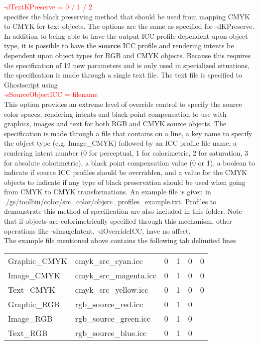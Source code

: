 \documentclass[12pt,notitlepage]{article}
\begin{document}
\textcolor{red}{-dTextKPreserve = 0 / 1 / 2}\\

\noindent specifies the black preserving method that should be used from mapping CMYK to CMYK for text objects.   The
options are the same as specified for -dKPreserve.\\

In addition to being able to have the output ICC profile dependent upon object type, it is possible to have the {\bf source} ICC profile and rendering intents be dependent upon object types for RGB and CMYK objects.  Because this requires the specification of 12 new parameters and is only used in specialized situations, the specification is made through a single text file.  The text file is specified to Ghostscript using\\

\textcolor{red}{-sSourceObjectICC = filename}\\

This option provides an extreme level of override control to specify the source color spaces, rendering intents and black point compensation to use with graphics, images and text for both RGB and CMYK source objects. The specification is made through a file that contains on a line, a key name to specify the object type (e.g. Image\_CMYK) followed by an ICC profile file name, a rendering intent number (0 for perceptual, 1 for colorimetric, 2 for saturation, 3 for absolute colorimetric), a black point compensation value (0 or 1), a boolean to indicate if source ICC profiles should be overridden, and a value for the CMYK objects to indicate if any type of black preservation should be used when going from CMYK to CMYK transformations. An example file is given in ./gs/toolbin/color/src\_color/objsrc\_profiles\_example.txt. Profiles to demonstrate this method of specification are also included in this folder. Note that if objects are colorimetrically specified through this mechanism, other operations like -sImageIntent, -dOverrideICC, have no affect.\\

The example file mentioned above contains the following tab delimited lines\\

\begin{tabular}{llllll}
Graphic\_CMYK & cmyk\_src\_cyan.icc	& 0 & 1 & 0 & 0 \\
Image\_CMYK	& cmyk\_src\_magenta.icc &	0 & 1 & 0 & 0  \\
Text\_CMYK	& cmyk\_src\_yellow.icc	 & 0 & 1 & 0 & 0  \\
Graphic\_RGB &	rgb\_source\_red.icc	& 0 & 1 & 0 & \\
Image\_RGB &	rgb\_source\_green.icc	& 0 & 1 & 0 & \\
Text\_RGB & rgb\_source\_blue.icc & 0 & 1 & 0 & \\
\end{tabular}\\
\end{document}
